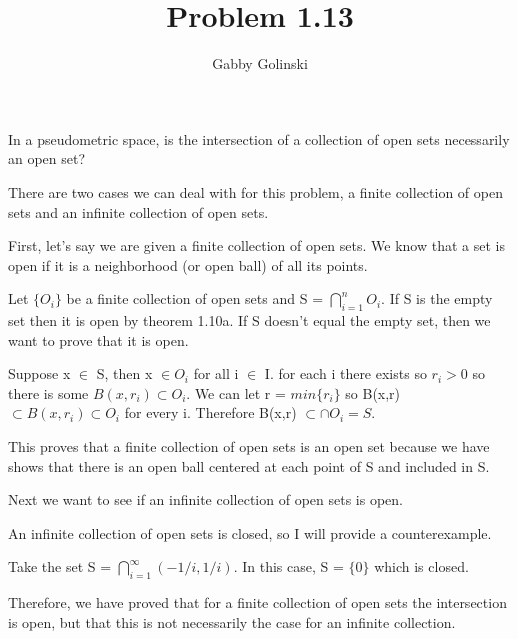 \documentclass{article}
\title{Problem 1.13}
\author{Gabby Golinski}
\begin{document}
\maketitle

In a pseudometric space, is the intersection of a collection of open sets necessarily an open set?

\bigskip

There are two cases we can deal with for this problem, a finite collection of open sets and an infinite collection of open sets.

\bigskip

First, let's say we are given a finite collection of open sets. We know that a set is open if it is a neighborhood (or open ball) of all its points.

Let $\{O_i\}$ be a finite collection of open sets and S = $\bigcap_{i=1}^{n} O_i$. If S is the empty set then it is open by theorem 1.10a. If S doesn't equal the empty set, then we want to prove that it is open.

Suppose x $\in$ S, then x $\in O_i$ for all i $\in$ I. for each i there exists so $r_i > 0$ so there is some $B(x, r_i) \subset O_i$. We can let r = $min\{r_i\}$ so B(x,r) $\subset B(x,r_i) \subset O_i$ for every i. Therefore B(x,r) $\subset \cap O_i = S$.

This proves that a finite collection of open sets is an open set because we have shows that there is an open ball centered at each point of S and included in S.

\bigskip

Next we want to see if an infinite collection of open sets is open.

An infinite collection of open sets is closed, so I will provide a counterexample.

Take the set S = $\bigcap_{i=1}^\infty (-1/i, 1/i)$. In this case, S = $\{0\}$ which is closed. 

\bigskip

Therefore, we have proved that for a finite collection of open sets the intersection is open, but that this is not necessarily the case for an infinite collection.
\end{document}
